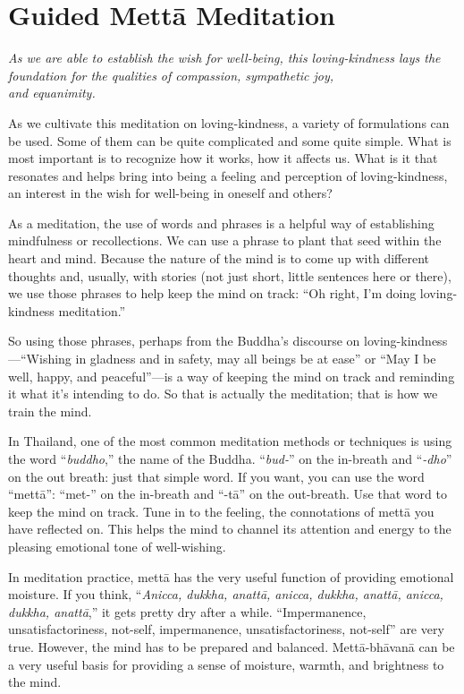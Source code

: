 \chapter{Guided Mettā Meditation}

\epigraph{\emph{As we are able to establish the wish for well-being,
this loving-kindness lays the foundation for the qualities of
compassion, sympathetic joy,\\and equanimity.}}{}

As we cultivate this meditation on loving-kindness, a variety of
formulations can be used. Some of them can be quite complicated and some
quite simple. What is most important is to recognize how it works, how
it affects us. What is it that resonates and helps bring into being a
feeling and perception of loving-kindness, an interest in the wish for
well-being in oneself and others?

As a meditation, the use of words and phrases is a helpful way of
establishing mindfulness or recollections. We can use a phrase to plant
that seed within the heart and mind. Because the nature of the mind is
to come up with different thoughts and, usually, with stories (not just
short, little sentences here or there), we use those phrases to help
keep the mind on track: “Oh right, I’m doing loving-kindness
meditation.”

So using those phrases, perhaps from the Buddha’s discourse on
loving-kindness—“Wishing in gladness and in safety, may all beings be at
ease” or “May I be well, happy, and peaceful”—is a way of keeping the
mind on track and reminding it what it’s intending to do. So that is
actually the meditation; that is how we train the mind.

In Thailand, one of the most common meditation methods or techniques is
using the word “\emph{buddho},” the name of the Buddha. “\emph{bud-}” on
the in-breath and “\emph{-dho}” on the out breath: just that simple
word. If you want, you can use the word “mettā”: “met-” on the in-breath
and “-tā” on the out-breath. Use that word to keep the mind on track.
Tune in to the feeling, the connotations of mettā you have reflected on.
This helps the mind to channel its attention and energy to the pleasing
emotional tone of well-wishing.

In meditation practice, mettā has the very useful function of providing
emotional moisture. If you think, “\emph{Anicca, dukkha, anattā, anicca,
dukkha, anattā, anicca, dukkha, anattā},” it gets pretty dry after a
while. “Impermanence, unsatisfactoriness, not-self, impermanence,
unsatisfactoriness, not-self” are very true. However, the mind has to be
prepared and balanced. Mettā-bhāvanā can be a very useful basis for
providing a sense of moisture, warmth, and brightness to the mind.

